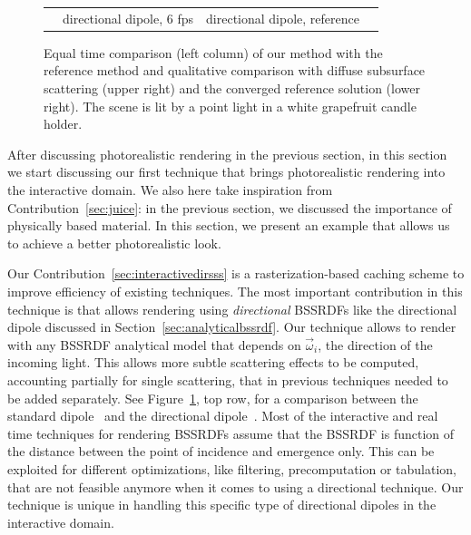 \begin{figure}[t]
\begin{tabular}{@{}c@{$\,$}c@{}c@{}c@{}}
& directional dipole, 6 fps & directional dipole, reference \\[-1ex]
\end{tabular}
\caption{Equal time comparison (left column) of our method with the reference method and qualitative comparison with diffuse subsurface scattering (upper right) and the converged reference solution (lower right). The scene is lit by a point light in a white grapefruit candle holder.} %
\label{fig:optixcomparison}
\end{figure}

After discussing photorealistic rendering in the previous section, in this section we start discussing our first technique that brings photorealistic rendering into the interactive domain. We also here take inspiration from Contribution~\ref{sec:juice}: in the previous section, we discussed the importance of physically based material. In this section, we present an example that allows us to achieve a better photorealistic look.

Our Contribution~\ref{sec:interactivedirsss} is a rasterization-based caching scheme to improve efficiency of existing techniques. The most important contribution in this technique is that allows rendering using \emph{directional} BSSRDFs like the directional dipole discussed in Section~\ref{sec:analyticalbssrdf}. Our technique allows to render with any BSSRDF analytical model that depends on $\vec{\omega}_i$, the direction of the incoming light. This allows more subtle scattering effects to be computed, accounting partially for single scattering, that in previous techniques needed to be added separately. See Figure~\ref{fig:optixcomparison}, top row, for a comparison between the standard dipole~\cite{Jensen2001} and the directional dipole~\cite{Frisvad2014}. Most of the interactive and real time techniques for rendering BSSRDFs assume that the BSSRDF is function of the distance between the point of incidence and emergence only. This can be exploited for different optimizations, like filtering, precomputation or tabulation, that are not feasible anymore when it comes to using a directional technique. Our technique is unique in handling this specific type of directional dipoles in the interactive domain. 

